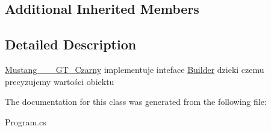 \subsection*{Additional Inherited Members}


\subsection{Detailed Description}
\hyperlink{class_builder_1_1_program_1_1_mustang__3__0___g_t___czarny}{Mustang\+\_\+\_\+\_\+\+G\+T\+\_\+\+Czarny} implementuje inteface \hyperlink{class_builder_1_1_program_1_1_builder}{Builder} dzieki czemu precyzujemy wartości obiektu 



The documentation for this class was generated from the following file\+:\begin{DoxyCompactItemize}
\item 
Program.\+cs\end{DoxyCompactItemize}
